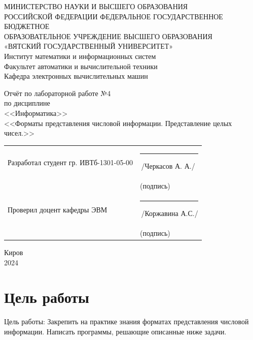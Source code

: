 \documentclass[oneside,a4paper,14pt]{extarticle}
\begin{document}
\newpage
\thispagestyle{empty}
\begin{center}
	МИНИСТЕРСТВО НАУКИ И ВЫСШЕГО ОБРАЗОВАНИЯ\\
	РОССИЙСКОЙ ФЕДЕРАЦИИ
	ФЕДЕРАЛЬНОЕ ГОСУДАРСТВЕННОЕ БЮДЖЕТНОЕ\\
	ОБРАЗОВАТЕЛЬНОЕ
	УЧРЕЖДЕНИЕ ВЫСШЕГО ОБРАЗОВАНИЯ\\
	«ВЯТСКИЙ ГОСУДАРСТВЕННЫЙ УНИВЕРСИТЕТ»\\
	Институт математики и информационных систем\\
	Факультет автоматики и вычислительной техники\\
	Кафедра электронных вычислительных машин
\end{center}
\vspace{20mm}

\begin{center}
	Отчёт по лабораторной работе №4\\
	по дисциплине\\
	<<Информатика>>\\
	<<Форматы представления числовой информации. Представление целых чисел.>>\\
\end{center}
\vspace{40mm}
\noindent
  \begin{tabular}{ll}
    Разработал студент гр. ИВТб-1301-05-00 & \rule[-1mm]{30mm}{0.10mm}\,/Черкасов А. А./\\
    & \hspace{8mm}\footnotesize(подпись)\\
     
    Проверил доцент кафедры ЭВМ & \rule[-1mm]{30mm}{0.10mm}\,/Коржавина А.С./\\
    & \hspace{8mm}\footnotesize(подпись)\\
  \end{tabular}

\vfill
\begin{center}
	Киров\\
	2024
\end{center}

\newpage\thispagestyle{plain}
\section*{Цель работы}
Цель работы: Закрепить на практике знания форматах представления числовой информации.
Написать программы, решающие описанные ниже задачи.
\end{document}
